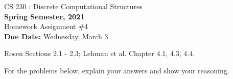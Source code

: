 \documentclass[12pt]{article}
\begin{document}
    \begin{center}
    {{\large CS 230 : Discrete Computational Structures}}
        \\

        {\bf Spring Semester, 2021}\\

        {\sc Homework Assignment \#4}\\
        {\bf Due Date:}  Wednesday, March 3
    \end{center}

     Rosen Sections 2.1 - 2.3; Lehman et al. Chapter 4.1, 4.3, 4.4.

    For the problems below, explain your answers and show your reasoning.

    \begin{enumerate}


\end{enumerate}
\end{document}
